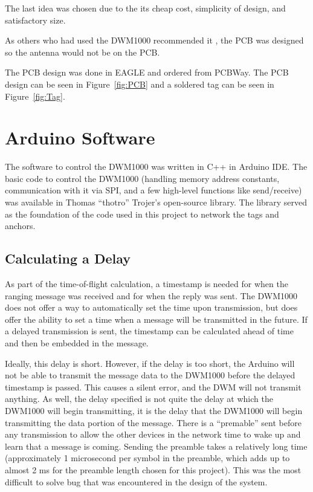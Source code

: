 The last idea was chosen due to the its cheap cost, simplicity of design, and satisfactory size. 

As others who had used the DWM1000 recommended it \cite{LPSMini}, the PCB was designed so the antenna would not be on the PCB.

The PCB design was done in EAGLE and ordered from PCBWay. The PCB design can be seen in Figure~\ref{fig:PCB} and a soldered tag can be seen in Figure~\ref{fig:Tag}.

\section{Arduino Software}
The software to control the DWM1000 was written in C++ in Arduino IDE. The basic code to control the DWM1000 (handling memory address constants, communication with it via SPI, and a few high-level functions like send/receive) was available in Thomas ``thotro'' Trojer's open-source  library. The library served as the foundation of the code used in this project to network the tags and anchors.

\subsection{Calculating a Delay}
\label{CalculatingADelay}
As part of the time-of-flight calculation, a timestamp is needed for when the ranging message was received and for when the reply was sent. The DWM1000 does not offer a way to automatically set the time upon transmission, but does offer the ability to set a time when a message will be transmitted in the future. If a delayed transmission is sent, the timestamp can be calculated ahead of time and then be embedded in the message.

Ideally, this delay is short. However, if the delay is too short, the Arduino will not be able to transmit the message data to the DWM1000 before the delayed timestamp is passed. This causes a silent error, and the DWM will not transmit anything. As well, the delay specified is not quite the delay at which the DWM1000 will begin transmitting, it is the delay that the DWM1000 will begin transmitting the data portion of the message. There is a ``premable'' sent before any transmission to allow the other devices in the network time to wake up and learn that a message is coming. Sending the preamble takes a relatively long time (approximately 1 microsecond per symbol in the preamble, which adds up to almost 2 ms for the preamble length chosen for this project). This was the most difficult to solve bug that was encountered in the design of the system.

